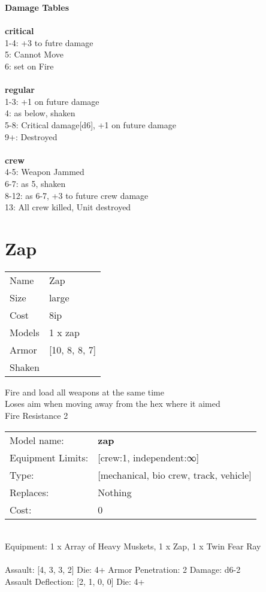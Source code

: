 {\bf Damage Tables} \\
\ \\ {\bf critical } \\
1-4: +3 to futre damage \\
5: Cannot Move \\
6: set on Fire \\
\ \\ {\bf regular } \\
1-3: +1 on future damage \\
4: as below, shaken \\
5-8: Critical damage[d6], +1 on future damage \\
9+: Destroyed \\
\ \\ {\bf crew } \\
4-5: Weapon Jammed \\
6-7: as 5, shaken \\
8-12: as 6-7, +3 to future crew damage \\
13: All crew killed, Unit destroyed \\










\pagebreak\pagebreak

\section{ Zap }

\begin{tabular}{ll}
  Name & Zap \\
  Size & large\\
  Cost & 8ip\\
  Models & 1 x zap\\
  Armor & [10, 8, 8, 7]\\
  Shaken & \\
\end{tabular}

\noindent Fire and load all weapons at the same time\\ 
Loses aim when moving away from the hex where it aimed\\ 
Fire Resistance 2\\ 


\noindent
\begin{tabular}{ll}
Model name: &{\bf zap } \\
Equipment Limits: &[crew:1, independent:∞] \\
Type: &[mechanical, bio crew, track, vehicle] \\
Replaces: &Nothing \\
Cost: & 0\\
\end{tabular}
\ \\
Equipment: 1 x Array of Heavy Muskets, 1 x Zap, 1 x Twin Fear Ray \\
\ \\
Assault: [4, 3, 3, 2] Die: 4+ Armor Penetration: 2 Damage: d6-2 \\
Assault Deflection: [2, 1, 0, 0] Die: 4+\\
\indent  
\ \\


